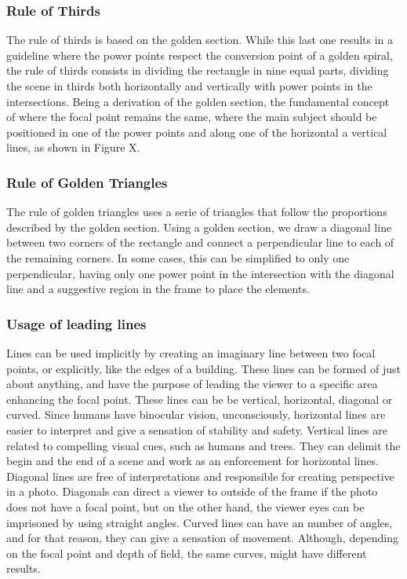 \subsubsection{Rule of Thirds}
\label{subsub:rule_thirds}

The rule of thirds is based on the golden section. While this last one results in a guideline where the power points respect the conversion point of a golden spiral, the rule of thirds consists in dividing the rectangle in nine equal parts, dividing the scene in thirds both horizontally and vertically with power points in the intersections.
Being a derivation of the golden section, the fundamental concept of where the focal point remains the same, where the main subject should be positioned in one of the power points and along one of the horizontal a vertical lines, as shown in Figure X.

\subsubsection{Rule of Golden Triangles}
\label{subsub:rule_triangles}

The rule of golden triangles uses a serie of triangles that follow the proportions described by the golden section. Using a golden section, we draw a diagonal line between two corners of the rectangle and connect a perpendicular line to each of the remaining corners. In some cases, this can be simplified to only one perpendicular, having only one power point in the intersection with the diagonal line and a suggestive region in the frame to place the elements.

\subsubsection{Usage of leading lines}
\label{subsub:leading_lines}

Lines can be used implicitly by creating an imaginary line between two focal points, or explicitly, like the edges of a building. These lines can be formed of just about anything, and have the purpose of leading the viewer to a specific area enhancing the focal point. These lines can be be vertical, horizontal, diagonal or curved.
Since humans have binocular vision, unconsciously, horizontal lines are easier to interpret and give a sensation of stability and safety. Vertical lines are related to compelling visual cues, such as humans and trees. They can delimit the begin and the end of a scene and work as an enforcement for horizontal lines.
Diagonal lines are free of interpretations and responsible for creating perspective in a photo. Diagonals can direct a viewer to outside of the frame if the photo does not have a focal point, but on the other hand, the viewer eyes can be imprisoned by using straight angles. 
Curved lines can have an number of angles, and for that reason, they can give a sensation of movement. Although, depending on the focal point and depth of field, the same curves, might have different results.


